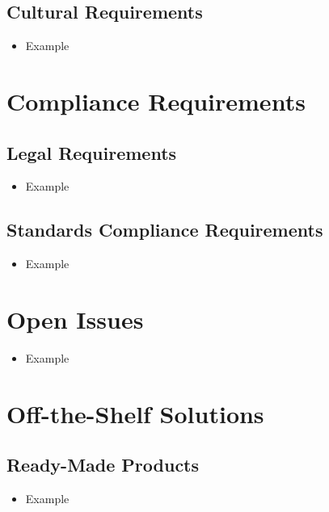 \documentclass[12pt]{article}
\begin{document}
  \subsection{Cultural Requirements}
    \begin{itemize}
      \item Example
    \end{itemize}

\section{Compliance Requirements}
  \subsection{Legal Requirements}
    \begin{itemize}
      \item Example
    \end{itemize}

  \subsection{Standards Compliance Requirements}
    \begin{itemize}
      \item Example
    \end{itemize}

\section{Open Issues}
  \begin{itemize}
    \item Example
  \end{itemize}

\section{Off-the-Shelf Solutions}
  \subsection{Ready-Made Products}
    \begin{itemize}
      \item Example
    \end{itemize}
\end{document}

